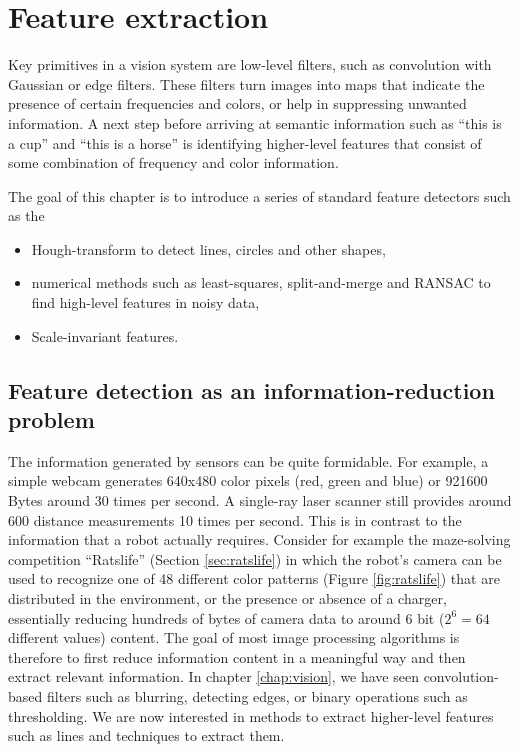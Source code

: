 \chapter{Feature extraction}\label{chap:feature_extraction}
Key primitives in a vision system are low-level filters, such as convolution with Gaussian or edge filters. These filters turn images into maps that indicate the presence of certain frequencies and colors, or help in suppressing unwanted information. A next step before arriving at semantic information such as ``this is a cup'' and ``this is a horse'' is identifying higher-level features that consist of some combination of frequency and color information. 

The goal of this chapter is to introduce a series of standard feature detectors such as the 
\begin{itemize}
\item Hough-transform to detect lines, circles and other shapes,
\item numerical methods such as least-squares, split-and-merge and RANSAC to find high-level features in noisy data,
\item Scale-invariant features.
\end{itemize}

\section{Feature detection as an information-reduction problem}
The information generated by sensors can be quite formidable. For example, a simple webcam generates 640x480 color pixels (red, green and blue) or 921600 Bytes around 30 times per second. A single-ray laser scanner still provides around 600 distance measurements 10 times per second. This is in contrast to the information that a robot actually requires. Consider for example the maze-solving competition ``Ratslife'' (Section \ref{sec:ratslife}) in which the robot's camera can be used to recognize one of 48 different color patterns (Figure \ref{fig:ratslife}) that are distributed in the environment, or the presence or absence of a charger, essentially reducing hundreds of bytes of camera data to around 6 bit ($2^6=64$ different values) content. The goal of most image processing algorithms is therefore to first reduce information content in a meaningful way and then extract relevant information. In chapter \ref{chap:vision}, we have seen convolution-based filters such as blurring, detecting edges, or binary operations such as thresholding. We are now interested in methods to extract higher-level features such as lines and techniques to extract them.

